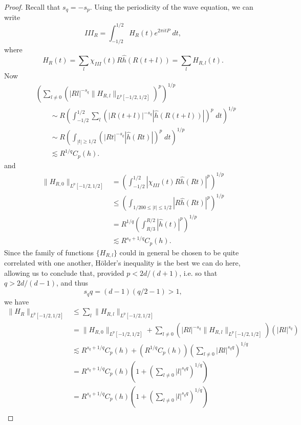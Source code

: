 \begin{proof}
    Recall that $s_q = - s_p$. Using the periodicity of the wave equation, we can write
    \[ III_R = \int_{-1/2}^{1/2} H_R(t) e^{2 \pi i t P}\; dt, \]
    where
    \[ H_R(t) = \sum_l \chi_{III}(t) R \widehat{h}(R(t + l)) = \sum_l H_{R,l}(t). \]
    Now
    \begin{align*}
        &\left( \sum_{l \neq 0} \left( |Rl|^{-s_q} \| H_{R,l} \|_{L^p[-1/2,1/2]} \right)^p \right)^{1/p}\\
        &\quad\quad \sim R \left( \int_{-1/2}^{1/2} \sum_l \left( |R(t + l)|^{-s_q} |\widehat{h}(R(t + l))| \right)^p\; dt \right)^{1/p}\\
        &\quad\quad\sim R \left( \int_{|t| \geq 1/2} \left( |Rt|^{-s_q} |\widehat{h}(Rt)| \right)^p\; dt \right)^{1/p} \\
        &\quad\quad\lesssim R^{1/q} C_p(h).
    \end{align*}
    and
    \begin{align*}
        \| H_{R,0} \|_{L^p[-1/2,1/2]} &= \left( \int_{-1/2}^{1/2} |\chi_{III}(t) R \widehat{h}(Rt)|^p \right)^{1/p}\\
        &\leq \left( \int_{1/200 \leq |t| \leq 1/2} |R \widehat{h}(Rt)|^p \right)^{1/p}\\
        &= R^{1/q} \left( \int_{R/3}^{R/2} |\widehat{h}(t)|^p \right)^{1/p}\\
        &\lesssim R^{s_q + 1/q} C_p(h).
    \end{align*}
    Since the family of functions $\{ H_{R,l} \}$ could in general be chosen to be quite correlated with one another, H\"{o}lder's inequality is the best we can do here, allowing us to conclude that, provided $p < 2d/(d+1)$, i.e. so that $q > 2d/(d-1)$, and thus
    \[ s_q q = (d-1)(q/2 - 1) > 1, \]
    we have
    \begin{align*}
        \| H_R \|_{L^p[-1/2,1/2]} &\leq \sum_l \| H_{R,l} \|_{L^p[-1/2,1/2]}\\
        &= \| H_{R,0} \|_{L^p[-1/2,1/2]} + \sum_{l \neq 0} \left( |Rl|^{-s_q} \| H_{R,l} \|_{L^p[-1/2,1/2]} \right) \left( |Rl|^{s_q} \right)\\
        &\lesssim R^{s_q + 1/q} C_p(h) + ( R^{1/q} C_p(h) ) \left( \sum_{l \neq 0} |Rl|^{s_q q} \right)^{1/q}\\
        &= R^{s_q + 1/q} C_p(h) \left( 1 + \left( \sum_{l \neq 0} |l|^{s_q q} \right)^{1/q} \right)\\
        &= R^{s_q + 1/q} C_p(h) \left( 1 + \left( \sum_{l \neq 0} |l|^{s_q q} \right)^{1/q} \right) \\

\end{align*}
\end{proof}
